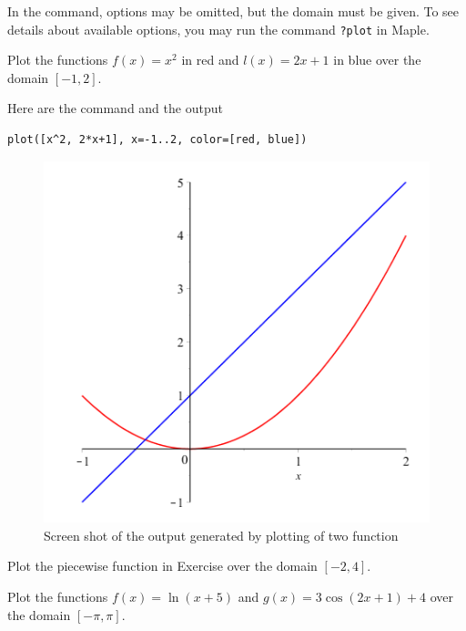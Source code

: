 \documentclass[]{book}
\theoremstyle{definition}
\theoremstyle{definition}
\theoremstyle{definition}
\theoremstyle{remark}
\let\BeginKnitrBlock\begin \let\EndKnitrBlock\end
\begin{document}
In the command, options may be omitted, but the domain must be given.
To see details about available options, you may run the command \texttt{?plot} in Maple.

\BeginKnitrBlock{example}
\protect\hypertarget{exm:unnamed-chunk-7}{}{\label{exm:unnamed-chunk-7} }
Plot the functions \(f(x)=x^2\) in red and \(l(x)=2x+1\) in blue over the domain \([-1, 2]\).
\EndKnitrBlock{example}

\BeginKnitrBlock{solution}
{}
Here are the command and the output

\begin{verbatim}
plot([x^2, 2*x+1], x=-1..2, color=[red, blue])
\end{verbatim}

\begin{figure}
\centering
\includegraphics{figs/First-Plot-Example.png}
\caption{Screen shot of the output generated by plotting of two function}
\end{figure}
\EndKnitrBlock{solution}

\BeginKnitrBlock{exercise}
\protect\hypertarget{exr:unnamed-chunk-9}{}{\label{exr:unnamed-chunk-9} }
Plot the piecewise function in Exercise  over the domain \([-2, 4]\).
\EndKnitrBlock{exercise}

\BeginKnitrBlock{exercise}
\protect\hypertarget{exr:unnamed-chunk-10}{}{\label{exr:unnamed-chunk-10} }
Plot the functions \(f(x)=\ln(x+5)\) and \(g(x)=3\cos(2x+1)+4\) over the domain \([-\pi, \pi]\).
\EndKnitrBlock{exercise}
\end{document}
